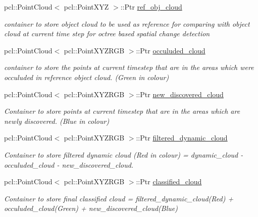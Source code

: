 \begin{DoxyCompactItemize}
pcl\+::\+Point\+Cloud$<$ pcl\+::\+Point\+X\+YZ $>$\+::Ptr \hyperlink{classdatmo_1_1cloud__segmentation_a4f4926a401828fc5226665963a2212cf}{ref\+\_\+obj\+\_\+cloud}
\begin{DoxyCompactList}\small\item\em container to store object cloud to be used as reference for comparing with object cloud at current time step for octree based spatial change detection \end{DoxyCompactList}\item 
pcl\+::\+Point\+Cloud$<$ pcl\+::\+Point\+X\+Y\+Z\+R\+GB $>$\+::Ptr \hyperlink{classdatmo_1_1cloud__segmentation_a2f85f1a51b2e90dbce996d90cb3e0155}{occuluded\+\_\+cloud}
\begin{DoxyCompactList}\small\item\em container to store the points at current timestep that are in the areas which were occuluded in reference object cloud. (Green in colour) \end{DoxyCompactList}\item 
pcl\+::\+Point\+Cloud$<$ pcl\+::\+Point\+X\+Y\+Z\+R\+GB $>$\+::Ptr \hyperlink{classdatmo_1_1cloud__segmentation_ac9374ddec382dc6dab33b34542a7b21d}{new\+\_\+discovered\+\_\+cloud}
\begin{DoxyCompactList}\small\item\em Container to store points at current timestep that are in the areas which are newly discovered. (Blue in colour) \end{DoxyCompactList}\item 
pcl\+::\+Point\+Cloud$<$ pcl\+::\+Point\+X\+Y\+Z\+R\+GB $>$\+::Ptr \hyperlink{classdatmo_1_1cloud__segmentation_a57c83961f5b33aa5655c679789f36387}{filtered\+\_\+dynamic\+\_\+cloud}
\begin{DoxyCompactList}\small\item\em Container to store filtered dynamic cloud (Red in colour) = dynamic\+\_\+cloud -\/ occuluded\+\_\+cloud -\/ new\+\_\+discovered\+\_\+cloud. \end{DoxyCompactList}\item 
pcl\+::\+Point\+Cloud$<$ pcl\+::\+Point\+X\+Y\+Z\+R\+GB $>$\+::Ptr \hyperlink{classdatmo_1_1cloud__segmentation_a5d51c3fb6f6206ce1e625bd3536414a0}{classified\+\_\+cloud}
\begin{DoxyCompactList}\small\item\em Container to store final classified cloud = filtered\+\_\+dynamic\+\_\+cloud(\+Red) + occuluded\+\_\+cloud(\+Green) + new\+\_\+discovered\+\_\+cloud(\+Blue) \end{DoxyCompactList}\item 

\end{DoxyCompactItemize}
